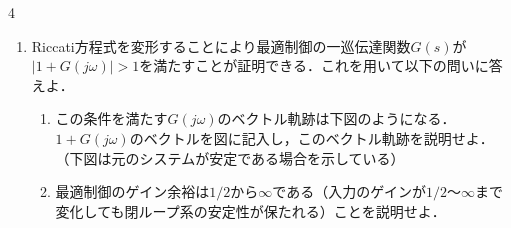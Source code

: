 \documentclass[fleqn]{article}
\begin{document}
\begin{multicols}{4}
\begin{enumerate}
\begin{enumerate}
\vfill\null
\columnbreak

\item
閉ループ系の極を求めよ．
\vspace{2cm}

\item
$r\rightarrow 0$としたときの閉ループ系の極を求めよ．
\vspace{2cm}

\item
$r \rightarrow \infty$としたときの閉ループ系の極を求めよ．
\vspace{2cm}

\item
$r\rightarrow 0$, $r \rightarrow \infty$なる評価関数を用いるということはどのような制御系を設計することに対応するのか，それぞれについて簡潔に述べよ．
\vspace{1cm}
\end{enumerate}




\vspace{-2cm}
\item
Riccati方程式を変形することにより最適制御の一巡伝達関数$G(s)$が$|1+ G(j\omega)|>1$を満たすことが証明できる．これを用いて以下の問いに答えよ．
\begin{enumerate}
\item
この条件を満たす$G(j\omega)$のベクトル軌跡は下図のようになる．$1+G(j \omega)$のベクトルを図に記入し，このベクトル軌跡を説明せよ．（下図は元のシステムが安定である場合を示している）
\vspace{5cm}
\item
最適制御のゲイン余裕は$1/2$から$\infty$である（入力のゲインが$1/2$〜$\infty$まで変化しても閉ループ系の安定性が保たれる）ことを説明せよ．
\end{enumerate}




\end{enumerate}
\end{multicols}
\end{document}
